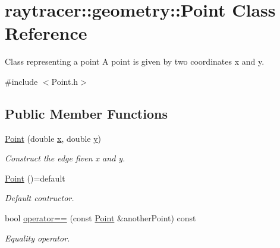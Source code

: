 \hypertarget{classraytracer_1_1geometry_1_1Point}{}\section{raytracer\+:\+:geometry\+:\+:Point Class Reference}
\label{classraytracer_1_1geometry_1_1Point}


Class representing a point A point is given by two coordinates x and y.  




{\ttfamily \#include $<$Point.\+h$>$}

\subsection*{Public Member Functions}
\begin{DoxyCompactItemize}
\item 
\hyperlink{classraytracer_1_1geometry_1_1Point_ad05a2dc2f77d1a2720a6dd19a6b1c5ed}{Point} (double \hyperlink{classraytracer_1_1geometry_1_1Point_a1408a40033e6273f93e539875dfe09b3}{x}, double \hyperlink{classraytracer_1_1geometry_1_1Point_a7fcd0651b22e64147a33dded20b72fd1}{y})
\begin{DoxyCompactList}\small\item\em Construct the edge fiven x and y. \end{DoxyCompactList}\item 
\hyperlink{classraytracer_1_1geometry_1_1Point_ac8c3dcaf9edb06b36bf3301348eb946a}{Point} ()=default
\begin{DoxyCompactList}\small\item\em Default contructor. \end{DoxyCompactList}\item 
bool \hyperlink{classraytracer_1_1geometry_1_1Point_ae363ee68a65544c87142d64433d790e0}{operator==} (const \hyperlink{classraytracer_1_1geometry_1_1Point}{Point} \&another\+Point) const
\begin{DoxyCompactList}\small\item\em Equality operator. \end{DoxyCompactList}\end{DoxyCompactItemize}
